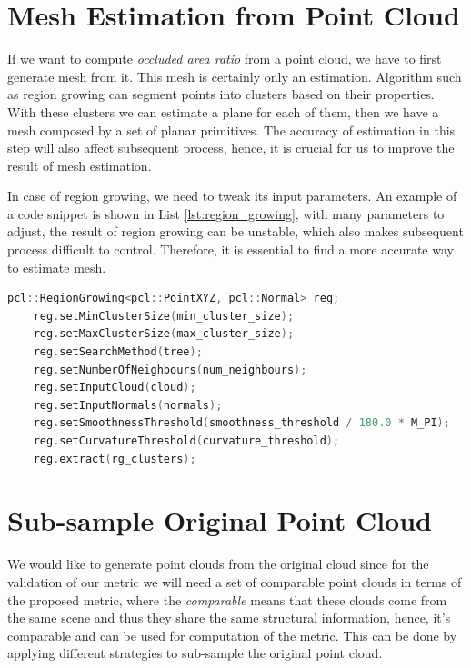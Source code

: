 \documentclass[11pt, a4paper,oneside,chapterprefix=false]{scrbook}
\begin{document}
\section{Mesh Estimation from Point Cloud} \label{mesh estimation of point cloud}

If we want to compute \emph{occluded area ratio} from a point cloud, we have to first generate mesh from it. This mesh is certainly only an estimation. Algorithm such as region growing \cite{pcl_tutorial_2023_rg} can segment points into clusters based on their properties. With these clusters we can estimate a plane for each of them, then we have a mesh composed by a set of planar primitives. The accuracy of estimation in this step will also affect subsequent process, hence, it is crucial for us to improve the result of mesh estimation. 

\vspace{10pt}

In case of region growing, we need to tweak its input parameters. An example of a code snippet is shown in List \ref{lst:region_growing}, with many parameters to adjust, the result of region growing can be unstable, which also makes subsequent process difficult to control. Therefore, it is essential to find a more accurate way to estimate mesh.   
\begin{lstlisting}[language=C++, caption=Region Growing, label=lst:region_growing]
    pcl::RegionGrowing<pcl::PointXYZ, pcl::Normal> reg;
    reg.setMinClusterSize(min_cluster_size);
    reg.setMaxClusterSize(max_cluster_size);
    reg.setSearchMethod(tree);
    reg.setNumberOfNeighbours(num_neighbours);
    reg.setInputCloud(cloud);
    reg.setInputNormals(normals);
    reg.setSmoothnessThreshold(smoothness_threshold / 180.0 * M_PI);
    reg.setCurvatureThreshold(curvature_threshold);
    reg.extract(rg_clusters);
\end{lstlisting}

\vspace{10pt}

\section{Sub-sample Original Point Cloud} \label{generate point cloud from estimated mesh}

We would like to generate point clouds from the original cloud since for the validation of our metric we will need a set of comparable point clouds in terms of the proposed metric, where the \emph{comparable} means that these clouds come from the same scene and thus they share the same structural information, hence, it's comparable and can be used for computation of the metric. This can be done by applying different strategies to sub-sample the original point cloud.
\end{document}

